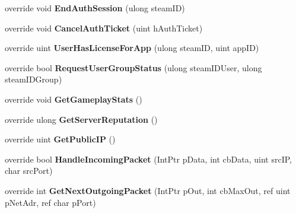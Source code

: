 \begin{DoxyCompactItemize}
override void {\bfseries End\+Auth\+Session} (ulong steam\+ID)
\item 
\mbox{\label{class_valve_1_1_steamworks_1_1_c_steam_game_server_a7ff628f367a4491d55959e7e190dd8b9}} 
override void {\bfseries Cancel\+Auth\+Ticket} (uint h\+Auth\+Ticket)
\item 
\mbox{\label{class_valve_1_1_steamworks_1_1_c_steam_game_server_a322f904f79579f3cb772cd96f8bde8c2}} 
override uint {\bfseries User\+Has\+License\+For\+App} (ulong steam\+ID, uint app\+ID)
\item 
\mbox{\label{class_valve_1_1_steamworks_1_1_c_steam_game_server_a97afc4b22decf19d0efe41258a2db3c6}} 
override bool {\bfseries Request\+User\+Group\+Status} (ulong steam\+I\+D\+User, ulong steam\+I\+D\+Group)
\item 
\mbox{\label{class_valve_1_1_steamworks_1_1_c_steam_game_server_a51bf3f0744ad4a86eabd7a863cd8be59}} 
override void {\bfseries Get\+Gameplay\+Stats} ()
\item 
\mbox{\label{class_valve_1_1_steamworks_1_1_c_steam_game_server_a0b3b6e46a7ccc9c2b799b3a1b65933a2}} 
override ulong {\bfseries Get\+Server\+Reputation} ()
\item 
\mbox{\label{class_valve_1_1_steamworks_1_1_c_steam_game_server_a00679290777a12e405028d5ad9b8a2ca}} 
override uint {\bfseries Get\+Public\+IP} ()
\item 
\mbox{\label{class_valve_1_1_steamworks_1_1_c_steam_game_server_a286835ffaff6a8d6c78b0d80140cc941}} 
override bool {\bfseries Handle\+Incoming\+Packet} (Int\+Ptr p\+Data, int cb\+Data, uint src\+IP, char src\+Port)
\item 
\mbox{\label{class_valve_1_1_steamworks_1_1_c_steam_game_server_a5d402300d1bb24ba2475692a6e54fbfb}} 
override int {\bfseries Get\+Next\+Outgoing\+Packet} (Int\+Ptr p\+Out, int cb\+Max\+Out, ref uint p\+Net\+Adr, ref char p\+Port)

\end{DoxyCompactItemize}
